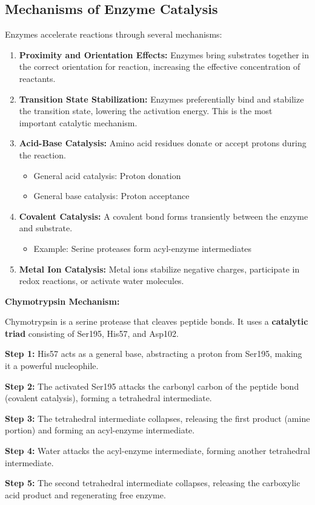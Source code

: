 \subsection{Mechanisms of Enzyme Catalysis}

Enzymes accelerate reactions through several mechanisms:

\begin{enumerate}[label=\arabic*.]
    \item \textbf{Proximity and Orientation Effects:} Enzymes bring substrates together in the correct orientation for reaction, increasing the effective concentration of reactants.
    
    \item \textbf{Transition State Stabilization:} Enzymes preferentially bind and stabilize the transition state, lowering the activation energy. This is the most important catalytic mechanism.
    
    \item \textbf{Acid-Base Catalysis:} Amino acid residues donate or accept protons during the reaction.
    \begin{itemize}
        \item General acid catalysis: Proton donation
        \item General base catalysis: Proton acceptance
    \end{itemize}
    
    \item \textbf{Covalent Catalysis:} A covalent bond forms transiently between the enzyme and substrate.
    \begin{itemize}
        \item Example: Serine proteases form acyl-enzyme intermediates
    \end{itemize}
    
    \item \textbf{Metal Ion Catalysis:} Metal ions stabilize negative charges, participate in redox reactions, or activate water molecules.
\end{enumerate}

\begin{example}
\textbf{Chymotrypsin Mechanism:}

Chymotrypsin is a serine protease that cleaves peptide bonds. It uses a \textbf{catalytic triad} consisting of Ser195, His57, and Asp102.

\textbf{Step 1:} His57 acts as a general base, abstracting a proton from Ser195, making it a powerful nucleophile.

\textbf{Step 2:} The activated Ser195 attacks the carbonyl carbon of the peptide bond (covalent catalysis), forming a tetrahedral intermediate.

\textbf{Step 3:} The tetrahedral intermediate collapses, releasing the first product (amine portion) and forming an acyl-enzyme intermediate.

\textbf{Step 4:} Water attacks the acyl-enzyme intermediate, forming another tetrahedral intermediate.

\textbf{Step 5:} The second tetrahedral intermediate collapses, releasing the carboxylic acid product and regenerating free enzyme.
\end{example}

